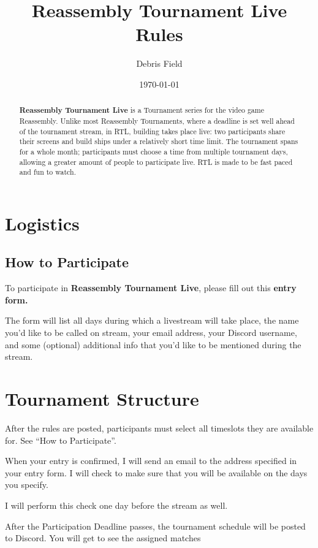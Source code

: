 \documentclass[11pt,letterpaper]{article}
\begin{document}
\title{Reassembly Tournament Live Rules}
\author{Debris Field}
\date{\today}
\maketitle
\renewcommand{\abstractname}{Summary}
\newcommand{\RTL}{\textbf{Reassembly Tournament Live}}

\begin{abstract}
\RTL{} is a Tournament
series for the video game Reassembly. Unlike most Reassembly Tournaments, where
a deadline is set well ahead of the tournament stream, in RTL,
building takes place live: two participants share their screens and
build ships under a relatively short time limit. The tournament spans
for a whole month; participants must choose a time from multiple
tournament days, allowing a greater amount of people to participate live.
RTL is made to be fast paced and fun to watch.
\end{abstract}

\tableofcontents

\section{Logistics}
\subsection{How to Participate}
To participate in \RTL{}, please fill out this \textbf{entry form.}

The form will list all days during which a livestream will take place, the name you'd like to
be called on stream, your email address, your Discord username, and 
some (optional) additional info that you'd like to be mentioned during the stream.

\section{Tournament Structure}
After the rules are posted, participants must select all timeslots they are available for.
See ``How to Participate''.

When your entry is confirmed, I will send an email to the address specified in your entry form.
I will check to make sure that you will be available on the days you specify.

I will perform this check one day before the stream as well.

After the Participation Deadline passes, the tournament schedule will be posted to Discord.
You will get to see the assigned matches 
\end{document}
